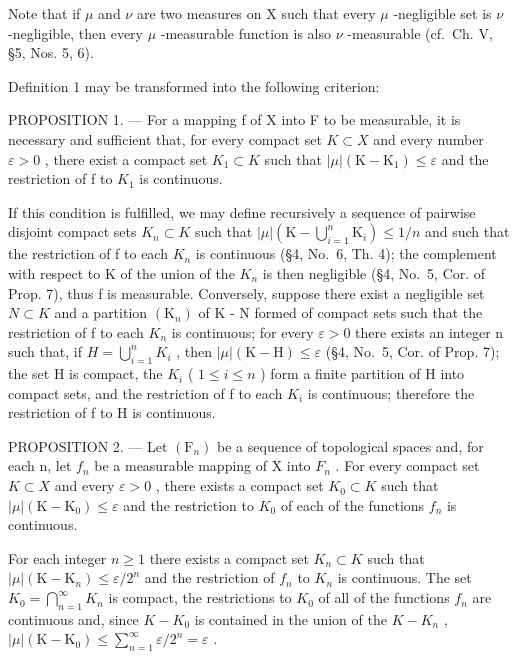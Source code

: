 Note that if \(\mu\) and \(\nu\) are two measures on X such that every \(\mu\) -negligible set is \(\nu\) -negligible, then every \(\mu\) -measurable function is also \(\nu\) -measurable (cf.~Ch. V, §5, Nos. 5, 6).

Definition 1 may be transformed into the following criterion:

PROPOSITION 1. --- For a mapping f of X into F to be measurable, it is necessary and sufficient that, for every compact set \(K \subset X\) and every number \(\varepsilon > 0\) , there exist a compact set \(K_{1} \subset K\) such that \(|\mu|(\mathrm{K} - \mathrm{K}_{1}) \leqslant \varepsilon\) and the restriction of f to \(K_{1}\) is continuous.

If this condition is fulfilled, we may define recursively a sequence of pairwise disjoint compact sets \(K_{n} \subset K\) such that \(|\mu|(\mathrm{K} - \bigcup_{i=1}^{n} \mathrm{K}_{i}) \leqslant 1/n\) and such that the restriction of f to each \(K_{n}\) is continuous (§4, No.~6, Th. 4); the complement with respect to K of the union of the \(K_{n}\) is then negligible (§4, No.~5, Cor. of Prop. 7), thus f is measurable. Conversely, suppose there exist a negligible set \(N \subset K\) and a partition \((\mathrm{K}_{n})\) of K - N formed of compact sets such that the restriction of f to each \(K_{n}\) is continuous; for every \(\varepsilon > 0\) there exists an integer n such that, if \(H = \bigcup_{i=1}^{n} K_{i}\) , then \(|\mu|(\mathrm{K} - \mathrm{H}) \leqslant \varepsilon\) (§4, No.~5, Cor. of Prop. 7); the set H is compact, the \(K_{i}\) ( \(1 \leqslant i \leqslant n\) ) form a finite partition of H into compact sets, and the restriction of f to each \(K_{i}\) is continuous; therefore the restriction of f to H is continuous.

PROPOSITION 2. --- Let \((\mathrm{F}_{n})\) be a sequence of topological spaces and, for each n, let \(f_{n}\) be a measurable mapping of X into \(F_{n}\) . For every compact set \(K \subset X\) and every \(\varepsilon > 0\) , there exists a compact set \(K_{0} \subset K\) such that \(|\mu|(\mathrm{K} - \mathrm{K}_{0}) \leqslant \varepsilon\) and the restriction to \(K_{0}\) of each of the functions \(f_{n}\) is continuous.

For each integer \(n \geqslant 1\) there exists a compact set \(K_{n} \subset K\) such that \(|\mu|(\mathrm{K} - \mathrm{K}_{n}) \leqslant \varepsilon/2^{n}\) and the restriction of \(f_{n}\) to \(K_{n}\) is continuous. The set \(K_{0} = \bigcap_{n=1}^{\infty} K_{n}\) is compact, the restrictions to \(K_{0}\) of all of the functions \(f_{n}\) are continuous and, since \(K - K_{0}\) is contained in the union of the \(K - K_{n}\) , \(|\mu|(\mathrm{K} - \mathrm{K}_{0}) \leqslant \sum_{n=1}^{\infty} \varepsilon/2^{n} = \varepsilon\) .

